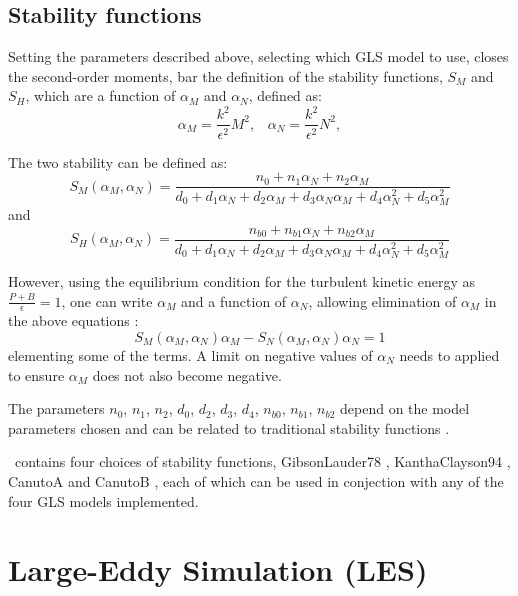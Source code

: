 \subsection{Stability functions}

Setting the parameters described above, \ie selecting which GLS model to use, closes the second-order 
moments, bar the definition of the stability functions, $S_M$ and $S_H$, 
which are a function of $\alpha_M$ and $\alpha_N$, defined as:
\begin{equation*}
\alpha_M=\frac{k^2}{\epsilon^2}M^2, \;\;\;
\alpha_N=\frac{k^2}{\epsilon^2}N^2,
\end{equation*}

The two stability can be defined as:
\begin{equation*}
S_M(\alpha_M,\alpha_N) = \frac{n_0+n_1\alpha_N+n_2\alpha_M}{d_0+d_1\alpha_N+d_2\alpha_M+d_3\alpha_N\alpha_M+d_4\alpha_N^2+d_5\alpha_M^2}
\end{equation*}
and
\begin{equation*}
S_H(\alpha_M,\alpha_N) = \frac{n_{b0}+n_{b1}\alpha_N+n_{b2}\alpha_M}{d_0+d_1\alpha_N+d_2\alpha_M+d_3\alpha_N\alpha_M+d_4\alpha_N^2+d_5\alpha_M^2}
\end{equation*}

However, using the equilibrium condition for the turbulent kinetic energy as $\frac{P+B}{\epsilon}=1$, one can write
$\alpha_M$ and a function of $\alpha_N$, allowing elimination of $\alpha_M$ in the above equations \citep{umlauf2005}:
\begin{equation*}
S_M(\alpha_M,\alpha_N)\alpha_M - S_N(\alpha_M,\alpha_N)\alpha_N=1
\end{equation*}
elementing some of the terms. A limit on negative values of $\alpha_N$ needs to applied to ensure $\alpha_M$ does not also become negative. 

The parameters $n_0$, $n_1$, $n_2$, $d_0$, $d_2$, $d_3$, $d_4$, $n_{b0}$, $n_{b1}$, $n_{b2}$ depend on
the model parameters chosen and can be related to traditional stability functions \citep{umlauf2005}.

\fluidity\ contains four choices of stability functions, GibsonLauder78 \citep{gibson1978}, KanthaClayson94 \citep{kantha1994}, CanutoA and CanutoB \citep{canuto2001}, each of which can be used in conjection with any of the four
GLS models implemented.

\section{Large-Eddy Simulation (LES)}

